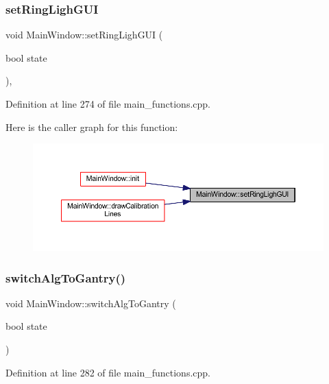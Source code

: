 \subsubsection{\texorpdfstring{setRingLighGUI}{setRingLighGUI}}
{\footnotesize\ttfamily void Main\+Window\+::set\+Ring\+Ligh\+G\+UI (\begin{DoxyParamCaption}\item[{bool}]{state }\end{DoxyParamCaption})\hspace{0.3cm}{\ttfamily [private]}, {\ttfamily [slot]}}



Definition at line 274 of file main\+\_\+functions.\+cpp.

Here is the caller graph for this function\+:
\nopagebreak
\begin{figure}[H]
\begin{center}
\leavevmode
\includegraphics[width=350pt]{classMainWindow_a64190d66464e087f1df9ba7541ae52ff_icgraph}
\end{center}
\end{figure}
\mbox{\label{classMainWindow_a28c0f3e2856ce2c44ba3ddad62a302a6}} 
\subsubsection{\texorpdfstring{switchAlgToGantry()}{switchAlgToGantry()}}
{\footnotesize\ttfamily void Main\+Window\+::switch\+Alg\+To\+Gantry (\begin{DoxyParamCaption}\item[{bool}]{state }\end{DoxyParamCaption})\hspace{0.3cm}{\ttfamily [private]}}



Definition at line 282 of file main\+\_\+functions.\+cpp.

